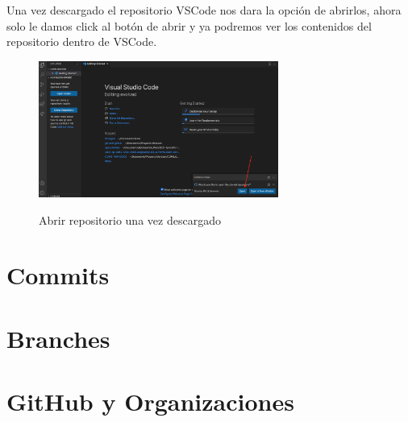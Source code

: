 \documentclass[11pt, oneside]{article}
\begin{document}
Una vez descargado el repositorio VSCode nos dara la opción de abrirlos, ahora solo le damos click al botón de abrir y ya podremos ver los contenidos del repositorio dentro de VSCode.

\begin{figure}[H]
  \centering
  \caption{Abrir repositorio una vez descargado}
  \includegraphics[width=0.70\textwidth]{./img/github-new-repo-12.png}
  \label{fig:github-new-repo-12}
\end{figure}

\section{Commits}

\section{Branches}

\section{GitHub y Organizaciones}
\end{document}
